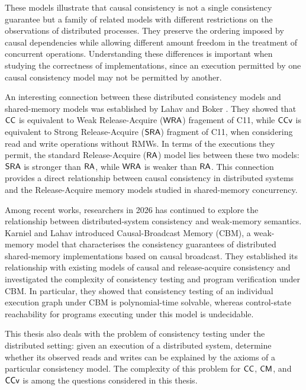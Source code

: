 These models illustrate that causal consistency is not a single consistency guarantee but a family of related models with different restrictions on the observations of distributed processes. They preserve the ordering imposed by causal dependencies while allowing different  amount freedom in the treatment of concurrent operations. Understanding these differences is important when studying the correctness of  implementations, since an execution permitted by one causal consistency model may not be permitted by another.

An interesting connection between these distributed consistency models and shared-memory models was established by Lahav and Boker \cite{Lahav:2022}. They showed that $\mathsf{CC}$ is equivalent to Weak Release-Acquire ($\mathsf{WRA}$) fragement of C11, while $\mathsf{CCv}$ is equivalent to Strong Release-Acquire ($\mathsf{SRA}$) fragment of C11, when considering read and write operations without RMWs. In terms of the executions they permit, the standard Release-Acquire ($\mathsf{RA}$) model lies between these two models: $\mathsf{SRA}$ is stronger than $\mathsf{RA}$, while $\mathsf{WRA}$ is weaker than $\mathsf{RA}$. This connection provides a direct relationship between causal consistency in distributed systems and the Release-Acquire memory models studied in shared-memory concurrency.
 
 Among recent works, researchers in 2026 has continued to explore the relationship between distributed-system consistency and weak-memory semantics. Karniel and Lahav \cite{Karniel2026} introduced Causal-Broadcast Memory (CBM), a weak-memory model that characterises the consistency guarantees of distributed shared-memory implementations based on causal broadcast. They established its relationship with existing models of causal and release-acquire consistency and investigated the complexity of consistency testing and program verification under CBM. In particular, they showed that consistency testing of an individual execution graph under CBM is polynomial-time solvable, whereas control-state reachability for programs executing under this model is undecidable.
 
 This thesis also deals with the problem of consistency testing under the distributed setting: given an execution of a distributed system, determine whether its observed reads and writes can be explained by the axioms of a particular consistency model. The complexity of this problem for $\mathsf{CC}$, $\mathsf{CM}$, and $\mathsf{CCv}$ is among the questions considered in this thesis.

